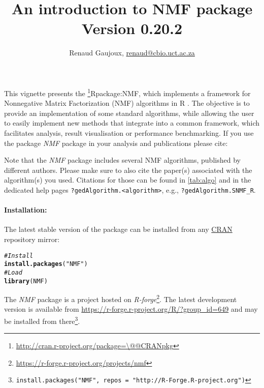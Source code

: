 \documentclass[a4paper]{article}\usepackage[]{graphicx}\usepackage[]{color}
\makeatletter
\newcommand{\hlstr}[1]{\textcolor[rgb]{0.192,0.494,0.8}{#1}}%
\newcommand{\hlcom}[1]{\textcolor[rgb]{0.678,0.584,0.686}{\textit{#1}}}%
\newcommand{\hlstd}[1]{\textcolor[rgb]{0.345,0.345,0.345}{#1}}%
\newcommand{\hlkwd}[1]{\textcolor[rgb]{0.737,0.353,0.396}{\textbf{#1}}}%
\newenvironment{kframe}{%
 \def\at@end@of@kframe{}%
 \ifinner\ifhmode%
  \def\at@end@of@kframe{\end{minipage}}%
  \begin{minipage}{\columnwidth}%
 \fi\fi%
 \def\FrameCommand##1{\hskip\@totalleftmargin \hskip-\fboxsep
 \colorbox{shadecolor}{##1}\hskip-\fboxsep
     \hskip-\linewidth \hskip-\@totalleftmargin \hskip\columnwidth}%
 \MakeFramed {\advance\hsize-\width
   \@totalleftmargin\z@ \linewidth\hsize
   \@setminipage}}%
 {\par\unskip\endMakeFramed%
 \at@end@of@kframe}
\newenvironment{knitrout}{}{} %
\let\code=\texttt
\newcommand{\pkgname}[1]{\textit{#1}\xspace}
\newcommand{\Rpkg}[1]{\pkgname{#1} package\xspace}
\newcommand{\CRANurl}[1]{\url{http://cran.r-project.org/package=#1}}
\def\CRANpkg{\@ifstar\@CRANpkg\@@CRANpkg}
\def\@CRANpkg#1{\href{http://cran.r-project.org/package=#1}{\pkgname{#1}}\footnote{\CRANurl{#1}}}
\def\@@CRANpkg#1{\href{http://cran.r-project.org/package=#1}{\pkgname{#1}} package\footnote{\CRANurl{#1}}}
\def\citeCRANpkg{\@ifstar\@citeCRANpkg\@@citeCRANpkg}
\def\@citeCRANpkg#1{\CRANpkg{#1}\cite*{Rpackage:#1}}
\def\@@citeCRANpkg#1{\CRANpkg{#1}~\cite{Rpackage:#1}}
\newcommand{\nmfpack}{\Rpkg{NMF}}
\renewcommand{\cite}[1]{\parencite{#1}}
\makeatother
\begin{document}
\title{An introduction to NMF package\\
\small Version 0.20.2}
\author{Renaud Gaujoux, \url{renaud@cbio.uct.ac.za}}

\maketitle

This vignette presents the \citeCRANpkg{NMF}, which implements a framework
for Nonnegative Matrix Factorization (NMF) algorithms in R \cite{R}.
The objective is to provide an implementation of some standard algorithms, while
allowing the user to easily implement new methods that integrate into a
common framework, which facilitates analysis, result visualisation or
performance benchmarking.
If you use the package \nmfpack in your analysis and publications please cite:

\bigskip
{}

Note that the \nmfpack includes several NMF algorithms, published by different
authors.
Please make sure to also cite the paper(s) associated with the algorithm(s)
you used.
Citations for those can be found in \cref{tab:algo} and in the dedicated help
pages \code{?gedAlgorithm.<algorithm>}, e.g., \code{?gedAlgorithm.SNMF\_R}.

\bigskip
\paragraph{Installation:} The latest stable version of the package can be installed from any
\href{http://cran.r-project.org}{CRAN} repository mirror:
\begin{knitrout}
\color{fgcolor}\begin{kframe}
\begin{alltt}
\hlcom{# Install}
\hlkwd{install.packages}\hlstd{(}\hlstr{"NMF"}\hlstd{)}
\hlcom{# Load}
\hlkwd{library}\hlstd{(NMF)}
\end{alltt}
\end{kframe}
\end{knitrout}

The \nmfpack is a project hosted on \emph{R-forge}\footnote{\url{https://r-forge.r-project.org/projects/nmf}}.
The latest development version is available from \url{https://r-forge.r-project.org/R/?group_id=649} and may be installed from there\footnote{\code{install.packages("NMF", repos = "http://R-Forge.R-project.org")}}.
\end{document}

